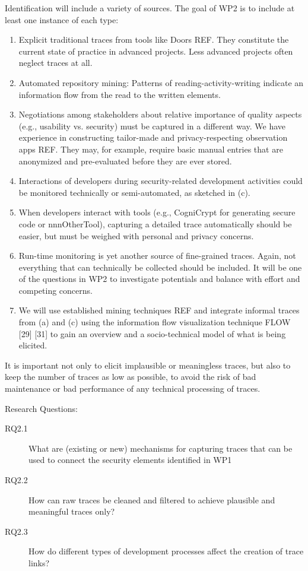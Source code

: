 Identification will include a variety of sources. The goal of WP2 is to include at least one instance of each type:
\begin{enumerate}
\item Explicit traditional traces from tools like Doors REF. They constitute the current state of practice in advanced projects. Less advanced projects often neglect traces at all.
\item  Automated repository mining: Patterns of reading-activity-writing indicate an information flow from the read to the written elements. 
\item  Negotiations among stakeholders about relative importance of quality aspects (e.g., usability vs. security) must be captured in a different way. We have experience in constructing tailor-made and privacy-respecting observation apps REF. They may, for example, require basic manual entries that are anonymized and pre-evaluated before they are ever stored.
\item  Interactions of developers during security-related development activities could be monitored technically or semi-automated, as sketched in (c).
\item  When developers interact with tools (e.g., CogniCrypt for generating secure code or nnnOtherTool), capturing a detailed trace automatically should be easier, but must be weighed with personal and privacy concerns.
\item  Run-time monitoring is yet another source of fine-grained traces. Again, not everything that can technically be collected should be included. It will be one of the questions in WP2 to investigate potentials and balance with effort and competing concerns.
\item  We will use established mining techniques REF and integrate informal traces from (a) and (c) using the information flow visualization technique FLOW [29] [31] to gain an overview and a socio-technical model of what is being elicited.
\end{enumerate}

It is important not only to elicit implausible or meaningless traces, but also to keep the number of traces as low as possible, to avoid the risk of bad maintenance or bad performance of any technical processing of traces.

Research Questions:
\begin{description}
\item[RQ2.1]  What are (existing or new) mechanisms for capturing traces that can be used to connect the security elements identified in WP1
\item[RQ2.2] How can raw traces be cleaned and filtered to achieve plausible and meaningful traces only?
\item[RQ2.3] How do different types of development processes affect the creation of trace links?
\end{description}

